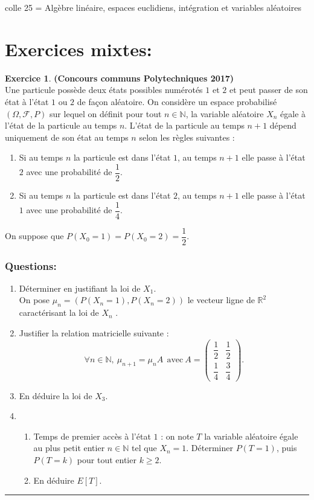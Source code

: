 \documentclass[a4paper,10pt]{article}
\theoremstyle{definition}
\theoremstyle{definition}
\newtheorem{exo}{Exercice}
\newcommand{\R}{\mathbb{R}}
\newcommand{\N}{\mathbb{N}}
\begin{document}
 	

\begin{center}
\Large \sc colle 25 = Algèbre linéaire, espaces euclidiens, intégration et variables aléatoires
\end{center}

\section*{Exercices mixtes:}%

\raggedright

\begin{exo}\textbf{(Concours communs Polytechniques 2017)}\quad\\[0.25cm]
Une particule possède deux états possibles numérotés $1$ et $2$ et peut passer de son état à l’état
$1$ ou $2$ de façon aléatoire. On considère un espace probabilisé $(\Omega, \mathcal{F}, P)$ sur lequel on définit
pour tout $n \in \N$, la variable aléatoire $X_n$ égale à l’état de la particule au temps $n$. L’état de la particule au temps $n 
+1$ dépend uniquement de son état au temps $n$ selon les règles suivantes :
\begin{enumerate}[$\bullet$]
	\item Si au temps $n$ la particule est dans l’état $1$, au temps $n + 1$ elle passe à l’état $2$ avec une probabilité de $\dfrac{1}{2}$.
	\item Si au temps $n$ la particule est dans l’état $2$, au temps $n + 1$ elle passe à l’état $1$ avec une probabilité de $\dfrac{1}{4}$.
\end{enumerate}
On suppose que $P(X_0 = 1) = P (X_0 = 2) =\dfrac{1}{2}$.
\subsubsection*{Questions:}
\begin{enumerate}
	\item Déterminer en justifiant la loi de $X_1$.\\
	On pose $\mu_n = (P(X_n = 1), P (X_n = 2))$ le vecteur ligne de $\R^2$ caractérisant la loi de $X_n$ .
	\item Justifier la relation matricielle suivante :
	$$\forall n \in \N, \  \mu_{n+1} = \mu_n A  \ \ \text{avec} \ A = \begin{pmatrix} \dfrac{1}{2} &\dfrac{1}{2}\\[0.5cm]
	\dfrac{1}{4} & \dfrac{3}{4}
	\end{pmatrix}.$$
	\item En déduire la loi de $X_3$.
	\item \begin{enumerate}
		\item Temps de premier accès à l’état $1$ : on note $T$ la variable aléatoire égale au plus petit entier $n \in \N$ tel que $X_n = 1$. Déterminer $P (T = 1)$, puis $P (T = k)$ pour tout entier $k \geq 2$.
		\item En déduire $E[T]$.
	\end{enumerate}
\end{enumerate}


\centering
\rule{1\linewidth}{0.6pt}
\end{exo}
\end{document}
